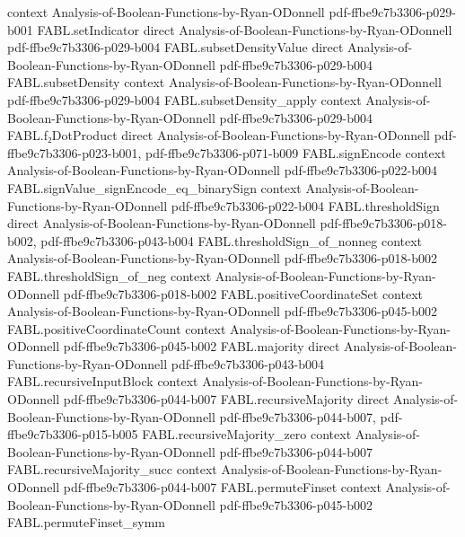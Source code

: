 \begin{theorem}
  {context}
  {Analysis-of-Boolean-Functions-by-Ryan-ODonnell}
  {pdf-ffbe9c7b3306-p029-b001}
\proofstep
  {FABL.setIndicator}
  {direct}
  {Analysis-of-Boolean-Functions-by-Ryan-ODonnell}
  {pdf-ffbe9c7b3306-p029-b004}
\proofstep
  {FABL.subsetDensityValue}
  {direct}
  {Analysis-of-Boolean-Functions-by-Ryan-ODonnell}
  {pdf-ffbe9c7b3306-p029-b004}
\proofstep
  {FABL.subsetDensity}
  {context}
  {Analysis-of-Boolean-Functions-by-Ryan-ODonnell}
  {pdf-ffbe9c7b3306-p029-b004}
\proofstep
  {FABL.subsetDensity_apply}
  {context}
  {Analysis-of-Boolean-Functions-by-Ryan-ODonnell}
  {pdf-ffbe9c7b3306-p029-b004}
\proofstep
  {FABL.f₂DotProduct}
  {direct}
  {Analysis-of-Boolean-Functions-by-Ryan-ODonnell}
  {pdf-ffbe9c7b3306-p023-b001,
    pdf-ffbe9c7b3306-p071-b009}
\proofstep
  {FABL.signEncode}
  {context}
  {Analysis-of-Boolean-Functions-by-Ryan-ODonnell}
  {pdf-ffbe9c7b3306-p022-b004}
\proofstep
  {FABL.signValue_signEncode_eq_binarySign}
  {context}
  {Analysis-of-Boolean-Functions-by-Ryan-ODonnell}
  {pdf-ffbe9c7b3306-p022-b004}
\proofstep
  {FABL.thresholdSign}
  {direct}
  {Analysis-of-Boolean-Functions-by-Ryan-ODonnell}
  {pdf-ffbe9c7b3306-p018-b002,
    pdf-ffbe9c7b3306-p043-b004}
\proofstep
  {FABL.thresholdSign_of_nonneg}
  {context}
  {Analysis-of-Boolean-Functions-by-Ryan-ODonnell}
  {pdf-ffbe9c7b3306-p018-b002}
\proofstep
  {FABL.thresholdSign_of_neg}
  {context}
  {Analysis-of-Boolean-Functions-by-Ryan-ODonnell}
  {pdf-ffbe9c7b3306-p018-b002}
\proofstep
  {FABL.positiveCoordinateSet}
  {context}
  {Analysis-of-Boolean-Functions-by-Ryan-ODonnell}
  {pdf-ffbe9c7b3306-p045-b002}
\proofstep
  {FABL.positiveCoordinateCount}
  {context}
  {Analysis-of-Boolean-Functions-by-Ryan-ODonnell}
  {pdf-ffbe9c7b3306-p045-b002}
\proofstep
  {FABL.majority}
  {direct}
  {Analysis-of-Boolean-Functions-by-Ryan-ODonnell}
  {pdf-ffbe9c7b3306-p043-b004}
\proofstep
  {FABL.recursiveInputBlock}
  {context}
  {Analysis-of-Boolean-Functions-by-Ryan-ODonnell}
  {pdf-ffbe9c7b3306-p044-b007}
\proofstep
  {FABL.recursiveMajority}
  {direct}
  {Analysis-of-Boolean-Functions-by-Ryan-ODonnell}
  {pdf-ffbe9c7b3306-p044-b007,
    pdf-ffbe9c7b3306-p015-b005}
\proofstep
  {FABL.recursiveMajority_zero}
  {context}
  {Analysis-of-Boolean-Functions-by-Ryan-ODonnell}
  {pdf-ffbe9c7b3306-p044-b007}
\proofstep
  {FABL.recursiveMajority_succ}
  {context}
  {Analysis-of-Boolean-Functions-by-Ryan-ODonnell}
  {pdf-ffbe9c7b3306-p044-b007}
\proofstep
  {FABL.permuteFinset}
  {context}
  {Analysis-of-Boolean-Functions-by-Ryan-ODonnell}
  {pdf-ffbe9c7b3306-p045-b002}
\proofstep
  {FABL.permuteFinset_symm}

\end{theorem}
